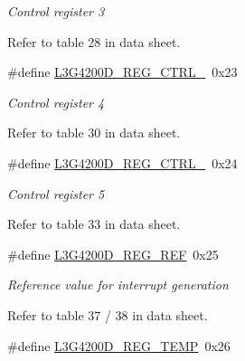 \begin{DoxyCompactItemize}
\begin{DoxyCompactList}\small\item\em \-Control register 3\par
 \-Refer to table 28 in data sheet. \end{DoxyCompactList}\item 
\hypertarget{group___l3_g4200_d___r_e_g_i_s_t_e_r_s_ga409c92ac9980a58088ea84deb3f1ac0e}{\#define \hyperlink{group___l3_g4200_d___r_e_g_i_s_t_e_r_s_ga409c92ac9980a58088ea84deb3f1ac0e}{\-L3\-G4200\-D\-\_\-\-R\-E\-G\-\_\-\-C\-T\-R\-L\-\_}~0x23}\label{group___l3_g4200_d___r_e_g_i_s_t_e_r_s_ga409c92ac9980a58088ea84deb3f1ac0e}

\begin{DoxyCompactList}\small\item\em \-Control register 4\par
 \-Refer to table 30 in data sheet. \end{DoxyCompactList}\item 
\hypertarget{group___l3_g4200_d___r_e_g_i_s_t_e_r_s_ga1fecfc94dd916cc374371ab4d708793e}{\#define \hyperlink{group___l3_g4200_d___r_e_g_i_s_t_e_r_s_ga1fecfc94dd916cc374371ab4d708793e}{\-L3\-G4200\-D\-\_\-\-R\-E\-G\-\_\-\-C\-T\-R\-L\-\_}~0x24}\label{group___l3_g4200_d___r_e_g_i_s_t_e_r_s_ga1fecfc94dd916cc374371ab4d708793e}

\begin{DoxyCompactList}\small\item\em \-Control register 5\par
 \-Refer to table 33 in data sheet. \end{DoxyCompactList}\item 
\hypertarget{group___l3_g4200_d___r_e_g_i_s_t_e_r_s_ga504f7f409b9672a2789f5d4755ef5535}{\#define \hyperlink{group___l3_g4200_d___r_e_g_i_s_t_e_r_s_ga504f7f409b9672a2789f5d4755ef5535}{\-L3\-G4200\-D\-\_\-\-R\-E\-G\-\_\-\-R\-E\-F}~0x25}\label{group___l3_g4200_d___r_e_g_i_s_t_e_r_s_ga504f7f409b9672a2789f5d4755ef5535}

\begin{DoxyCompactList}\small\item\em \-Reference value for interrupt generation\par
 \-Refer to table 37 / 38 in data sheet. \end{DoxyCompactList}\item 
\hypertarget{group___l3_g4200_d___r_e_g_i_s_t_e_r_s_gaeb2ef4d078697850509caca5f4907ef7}{\#define \hyperlink{group___l3_g4200_d___r_e_g_i_s_t_e_r_s_gaeb2ef4d078697850509caca5f4907ef7}{\-L3\-G4200\-D\-\_\-\-R\-E\-G\-\_\-\-T\-E\-M\-P}~0x26}\label{group___l3_g4200_d___r_e_g_i_s_t_e_r_s_gaeb2ef4d078697850509caca5f4907ef7}


\end{DoxyCompactItemize}
